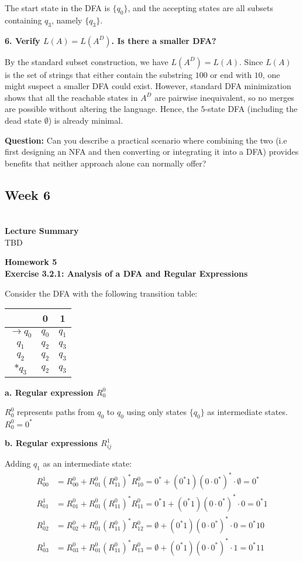\documentclass{article}
\theoremstyle{theorem}
\theoremstyle{definition}
\theoremstyle{remark}
\begin{document}
The start state in the DFA is $\{q_0\}$, and the accepting states are 
all subsets containing $q_3$, namely $\{q_3\}$.

\textbf{6. Verify $L(A) = L(A^D)$. Is there a smaller DFA?}

By the standard subset construction, we have $L(A^D) = L(A)$. 
Since $L(A)$ is the set of strings that either contain the substring $100$ or end with $10$, 
one might suspect a smaller DFA could exist. However, standard DFA 
minimization shows that all the reachable states in $A^D$ are pairwise 
inequivalent, so no merges are possible without altering the language. 
Hence, the $5$-state DFA (including the dead state $\emptyset$) is already minimal.

\textbf{Question:} Can you describe a practical scenario where combining the two (i.e first designing an NFA and then converting or integrating it into a DFA) provides benefits that neither approach alone can normally offer?


\subsection{\textbf{Week 6}}\\
\textbf{Lecture Summary}\\
TBD

\textbf{Homework 5}\\
\textbf{Exercise 3.2.1: Analysis of a DFA and Regular Expressions}

Consider the DFA with the following transition table:
\begin{center}
\begin{tabular}{c|cc}
 & 0 & 1 \\ \hline
$\to q_0$ & $q_0$ & $q_1$ \\
$q_1$ & $q_2$ & $q_3$ \\
$q_2$ & $q_2$ & $q_3$ \\
$*q_3$ & $q_2$ & $q_3$ \\
\end{tabular}
\end{center}

\textbf{a. Regular expression $R^0_0$}

$R^0_0$ represents paths from $q_0$ to $q_0$ using only states $\{q_0\}$ as intermediate states.
$R^0_0 = 0^*$

\textbf{b. Regular expressions $R^1_{ij}$}

Adding $q_1$ as an intermediate state:
\begin{align*}
R^1_{00} &= R^0_{00} + R^0_{01}(R^0_{11})^*R^0_{10} = 0^* + (0^*1)(0 \cdot 0^*)^* \cdot \emptyset = 0^* \\
R^1_{01} &= R^0_{01} + R^0_{01}(R^0_{11})^*R^0_{11} = 0^*1 + (0^*1)(0 \cdot 0^*)^* \cdot 0 = 0^*1 \\
R^1_{02} &= R^0_{02} + R^0_{01}(R^0_{11})^*R^0_{12} = \emptyset + (0^*1)(0 \cdot 0^*)^* \cdot 0 = 0^*10 \\
R^1_{03} &= R^0_{03} + R^0_{01}(R^0_{11})^*R^0_{13} = \emptyset + (0^*1)(0 \cdot 0^*)^* \cdot 1 = 0^*11 \\
\end{align*}
\end{document}
